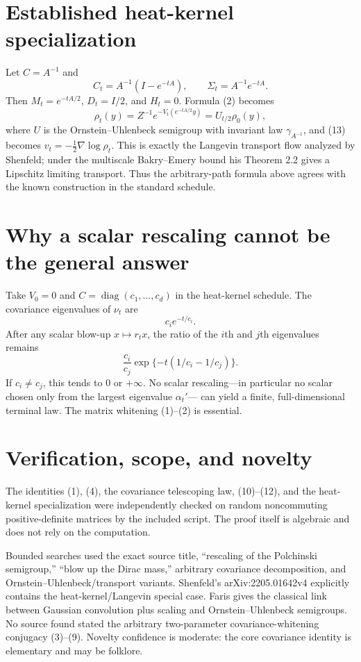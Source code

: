 \documentclass[11pt]{article}
\begin{document}
\section*{Established heat-kernel specialization}

Let $C=A^{-1}$ and
\[
 C_t=A^{-1}(I-e^{-tA}),\qquad \Sigma_t=A^{-1}e^{-tA}.
\]
Then $M_t=e^{-tA/2}$, $D_t=I/2$, and $H_t=0$.  Formula (2) becomes
\begin{equation*}
 \rho_t(y)=Z^{-1}e^{-V_t(e^{-tA/2}y)}
           =U_{t/2}\rho_0(y),                                    \tag{14}
\end{equation*}
where $U$ is the Ornstein--Uhlenbeck semigroup with invariant law
$\gamma_{A^{-1}}$, and (13) becomes
$v_t=-\frac12\nabla\log\rho_t$.  This is exactly the Langevin transport
flow analyzed by Shenfeld; under the multiscale Bakry--Emery bound his
Theorem 2.2 gives a Lipschitz limiting transport.  Thus the arbitrary-path
formula above agrees with the known construction in the standard schedule.

\section*{Why a scalar rescaling cannot be the general answer}

Take $V_0=0$ and
$C=\operatorname{diag}(c_1,\ldots,c_d)$ in the heat-kernel schedule.  The
covariance eigenvalues of $\nu_t$ are
\[
                         c_i e^{-t/c_i}.
\]
After any scalar blow-up $x\mapsto r_tx$, the ratio of the $i$th and $j$th
eigenvalues remains
\[
 \frac{c_i}{c_j}\exp\{-t(1/c_i-1/c_j)\}.
\]
If $c_i\ne c_j$, this tends to $0$ or $+\infty$.  No scalar rescaling---in
particular no scalar chosen only from the largest eigenvalue $\alpha_t'$---
can yield a finite, full-dimensional terminal law.  The matrix whitening
(1)--(2) is essential.

\section*{Verification, scope, and novelty}

The identities (1), (4), the covariance telescoping law, (10)--(12), and the
heat-kernel specialization were independently checked on random noncommuting
positive-definite matrices by the included script.  The proof itself is
algebraic and does not rely on the computation.

Bounded searches used the exact source title, ``rescaling of the Polchinski
semigroup,'' ``blow up the Dirac mass,'' arbitrary covariance decomposition,
and Ornstein--Uhlenbeck/transport variants.  Shenfeld's
arXiv:2205.01642v4 explicitly contains the heat-kernel/Langevin special case.
Faris gives the classical link between Gaussian convolution plus scaling and
Ornstein--Uhlenbeck semigroups.  No source found stated the arbitrary
two-parameter covariance-whitening conjugacy (3)--(9).  Novelty confidence is
moderate: the core covariance identity is elementary and may be folklore.
\end{document}
